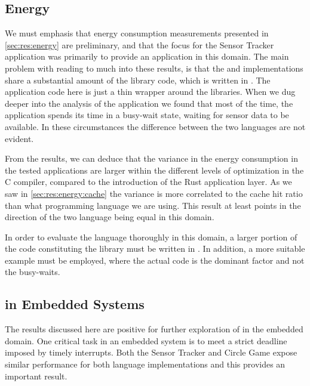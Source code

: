 \subsection{Energy}

We must emphasis that energy consumption measurements presented in \autoref{sec:res:energy} are preliminary, and that the focus for the Sensor Tracker application was primarily to provide an application in this domain.
The main problem with reading to much into these results, is that the {\rust} and {\C} implementations share a substantial amount of the library code, which is written in {\C}.
The application code here is just a thin wrapper around the libraries.
When we dug deeper into the analysis of the application we found that most of the time, the application spends its time in a busy-wait state, waiting for sensor data to be available.
In these circumstances the difference between the two languages are not evident.

From the results, we can deduce that the variance in the energy consumption in the tested applications are larger within the different levels of optimization in the C compiler, compared to the introduction of the Rust application layer.
As we saw in \autoref{sec:res:energy:cache} the variance is more correlated to the cache hit ratio than what programming language we are using.
This result at least points in the direction of the two language being equal in this domain.

In order to evaluate the {\rust} language thoroughly in this domain, a larger portion of the code constituting the library must be written in {\rust}.
In addition, a more suitable example must be employed, where the actual code is the dominant factor and not the busy-waits.

\subsection{{\rust} in Embedded Systems}

The results discussed here are positive for further exploration of {\rust} in the embedded domain.
One critical task in an embedded system is to meet a strict deadline imposed by timely interrupts.
Both the Sensor Tracker and Circle Game expose similar performance for both language implementations and this provides an important result.

